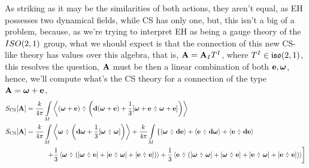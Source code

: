 As striking as it may be the similarities of both actions, they aren't equal, as EH possesses two dynamical fields, while CS has only one, but, this isn't 
a big of a problem, because, as we're trying to interpret EH as being a gauge theory of the $ISO\qty(2,1)$ group, what we should expect is that the connection of 
this new CS-like theory has values over this algebra, that is, $\vb A=\vb A_IT^I$, where $T^I\in\mathfrak{iso}\qty(2,1)$, this resolves the question, $\vb A$ must be then a 
linear combination of both $\vb e,\boldsymbol\omega$, hence, we'll compute what's the CS theory for a connection of the type $\vb A=\boldsymbol\omega+\vb e$,
\begin{align*}
    S_{\textnormal{CS}}\qty[\vb A]&=\frac{k}{4\pi}\int\limits_M\expval{\qty(\boldsymbol\omega+\vb e)\ \wedgecomma\ \qty(\vb d{\qty(\boldsymbol\omega+\vb e)}+\frac13\wedgecomm{\boldsymbol\omega+\vb e}{\boldsymbol\omega+\vb e})}\\
    S_{\textnormal{CS}}\qty[\vb A]&=\frac{k}{4\pi}\int\limits_M\expval{\boldsymbol\omega\ \wedgecomma\ \qty(\vb d\boldsymbol\omega+\frac13\wedgecomm{\boldsymbol\omega}{\boldsymbol\omega})}+\frac{k}{4\pi}\int\limits_M\left\{\expval{\boldsymbol\omega\ \wedgecomma\ \vb d{\vb e}}+\expval{\vb e\ \wedgecomma\ \vb d{\boldsymbol\omega}}+\expval{\vb e\ \wedgecomma\ \vb d{\vb e}}\right.\\
    &\quad\quad\quad\left.+\frac13\expval{\boldsymbol\omega\ \wedgecomma\ \qty(\wedgecomm{\boldsymbol\omega}{\vb e}+\wedgecomm{\vb e}{\boldsymbol\omega}+\wedgecomm{\vb e}{\vb e})}+\frac13\expval{\vb e\ \wedgecomma\ \qty(\wedgecomm{\boldsymbol\omega}{\boldsymbol\omega}+\wedgecomm{\boldsymbol\omega}{\vb e}+\wedgecomm{\vb e}{\boldsymbol\omega}+\wedgecomm{\vb e}{\vb e})}\right]
\end{align*}

